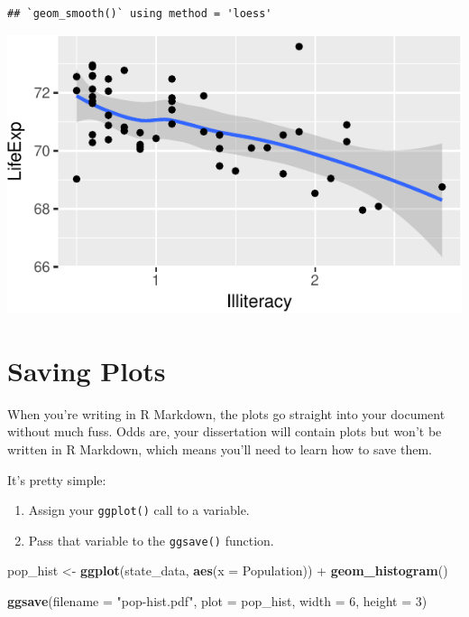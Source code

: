 \documentclass[12pt,oneside,openany]{tufte-book}
\newenvironment{Shaded}{}{}
\newcommand{\KeywordTok}[1]{\textcolor[rgb]{0.00,0.44,0.13}{\textbf{{#1}}}}
\newcommand{\DataTypeTok}[1]{\textcolor[rgb]{0.56,0.13,0.00}{{#1}}}
\newcommand{\DecValTok}[1]{\textcolor[rgb]{0.25,0.63,0.44}{{#1}}}
\newcommand{\StringTok}[1]{\textcolor[rgb]{0.25,0.44,0.63}{{#1}}}
\newcommand{\NormalTok}[1]{{#1}}
\providecommand{\tightlist}{%
  \setlength{\itemsep}{0pt}\setlength{\parskip}{0pt}}
\begin{document}
\begin{verbatim}
## `geom_smooth()` using method = 'loess'
\end{verbatim}

\includegraphics{pdaps_files/figure-latex/combine-1}

\section{Saving Plots}\label{saving-plots}

When you're writing in R Markdown, the plots go straight into your
document without much fuss. Odds are, your dissertation will contain
plots but won't be written in R Markdown, which means you'll need to
learn how to save them.

It's pretty simple:

\begin{enumerate}
\def\labelenumi{\arabic{enumi}.}
\tightlist
\item
  Assign your \texttt{ggplot()} call to a variable.
\item
  Pass that variable to the \texttt{ggsave()} function.
\end{enumerate}

\begin{Shaded}
\begin{Highlighting}[]
\NormalTok{pop_hist <-}\StringTok{ }\KeywordTok{ggplot}\NormalTok{(state_data, }\KeywordTok{aes}\NormalTok{(}\DataTypeTok{x =} \NormalTok{Population)) +}\StringTok{ }
\StringTok{    }\KeywordTok{geom_histogram}\NormalTok{()}

\KeywordTok{ggsave}\NormalTok{(}\DataTypeTok{filename =} \StringTok{"pop-hist.pdf"}\NormalTok{, }\DataTypeTok{plot =} \NormalTok{pop_hist, }
    \DataTypeTok{width =} \DecValTok{6}\NormalTok{, }\DataTypeTok{height =} \DecValTok{3}\NormalTok{)}
\end{Highlighting}
\end{Shaded}
\end{document}
